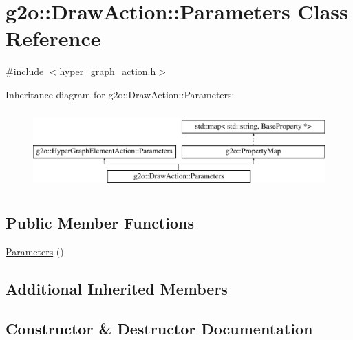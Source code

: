 \hypertarget{classg2o_1_1_draw_action_1_1_parameters}{}\section{g2o\+:\+:Draw\+Action\+:\+:Parameters Class Reference}
\label{classg2o_1_1_draw_action_1_1_parameters}


{\ttfamily \#include $<$hyper\+\_\+graph\+\_\+action.\+h$>$}

Inheritance diagram for g2o\+:\+:Draw\+Action\+:\+:Parameters\+:\begin{figure}[H]
\begin{center}
\leavevmode
\includegraphics[height=3.000000cm]{classg2o_1_1_draw_action_1_1_parameters}
\end{center}
\end{figure}
\subsection*{Public Member Functions}
\begin{DoxyCompactItemize}
\item 
\mbox{\hyperlink{classg2o_1_1_draw_action_1_1_parameters_ade816dc0924de9acd14c4a35636f6bd4}{Parameters}} ()
\end{DoxyCompactItemize}
\subsection*{Additional Inherited Members}


\subsection{Constructor \& Destructor Documentation}
\mbox{\label{classg2o_1_1_draw_action_1_1_parameters_ade816dc0924de9acd14c4a35636f6bd4}} 
